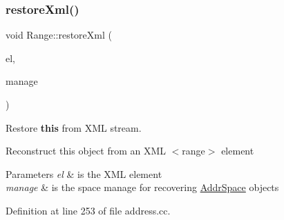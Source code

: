 \subsubsection{\texorpdfstring{restoreXml()}{restoreXml()}}
{\footnotesize\ttfamily void Range\+::restore\+Xml (\begin{DoxyParamCaption}\item[{const \mbox{\hyperlink{class_element}{Element}} $\ast$}]{el,  }\item[{const \mbox{\hyperlink{class_addr_space_manager}{Addr\+Space\+Manager}} $\ast$}]{manage }\end{DoxyParamCaption})}



Restore {\bfseries{this}} from X\+ML stream. 

Reconstruct this object from an X\+ML $<$range$>$ element 
\begin{DoxyParams}{Parameters}
{\em el} & is the X\+ML element \\
\hline
{\em manage} & is the space manage for recovering \mbox{\hyperlink{class_addr_space}{Addr\+Space}} objects \\
\hline
\end{DoxyParams}


Definition at line 253 of file address.\+cc.

